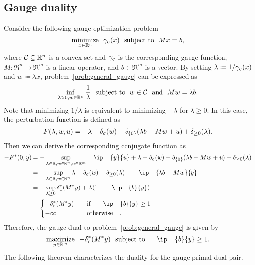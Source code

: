 \subsection{Gauge duality}
Consider the following gauge optimization problem 
\begin{equation} \label{prob:general_gauge} 
    \displaystyle\mathop{\hbox{\rm minimize}}_{x \in \mathbb{R}^n}\enspace \gamma_{\scriptscriptstyle\mathcal{C}}(x) \enspace\mathop{\hbox{\rm subject to}}\enspace Mx = b,
\end{equation}
where $\mathcal{C}\subseteq\mathbb{R}^n$ is a convex set and $\gamma_{\scriptscriptstyle\mathcal{C}}$ is the corresponding gauge function, $M:\Re^n\to\Re^m$ is a linear operator, and $b\in\Re^m$ is a vector. By setting 
$\lambda \coloneqq 1/\gamma_{\scriptscriptstyle\mathcal{C}}(x)$ and $w \coloneqq \lambda x$, problem~\eqref{prob:general_gauge} can be expressed as 
\begin{equation} \label{prob:general_gauge2} 
    \inf_{\lambda > 0, w \in \mathbb{R}^n} \frac{1}{\lambda} \enspace\mathop{\hbox{\rm subject to}}\enspace w \in \mathcal{C} \enspace\mathop{\hbox{\rm and}}\enspace Mw = \lambda b.
\end{equation}
Note that minimizing $1/\lambda$ is equivalent to minimizing $-\lambda$ for $\lambda \geq 0$. In this case, the perturbation function is defined as 
\begin{equation}
    F(\lambda, w, u) = -\lambda + \delta_{\scriptscriptstyle\mathcal{C}}(w) + \delta_{\{0\}}(\lambda b - Mw + u) + \delta_{\geq 0}(\lambda). 
\end{equation}
Then we can derive the corresponding conjugate function as
\begin{align*}
    -F^*(0, y) &= -\sup_{\lambda\in\Re, w\in\Re^n, u\in\Re^m} \ip{y}{u} + \lambda - \delta\Cs(w) - \delta_{\{0\}}(\lambda b - Mw + u) - \delta_{\geq 0}(\lambda)
    \\&= -\sup_{\lambda\in\Re, w\in\Re^n} \lambda - \delta\Cs(w) - \delta_{\geq 0}(\lambda) - \ip{\lambda b - Mw}{y}
    \\&= -\sup_{\lambda\geq 0} \delta\Cs^*(M^*y) + \lambda ( 1 - \ip{b}{y} )
    \\&= 
        \begin{cases}
            -\delta\Cs^*(M^*y) & \text{if} \ip{b}{y} \geq 1 \\
            -\infty & \text{otherwise}.
        \end{cases}
\end{align*}
Therefore, the gauge dual to problem~\eqref{prob:general_gauge} is given by
\begin{equation} \label{prob:general_gauge_dual}
    \maximize{y\in\Re^m} -\delta\Cs^*(M^*y) \st \ip{b}{y} \geq 1.
\end{equation}
The following theorem characterizes the duality for the gauge primal-dual pair. 

